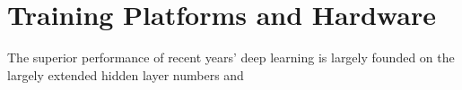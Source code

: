 \section{Training Platforms and Hardware}
The superior performance of recent years' deep learning is largely founded on the largely extended hidden layer numbers and  